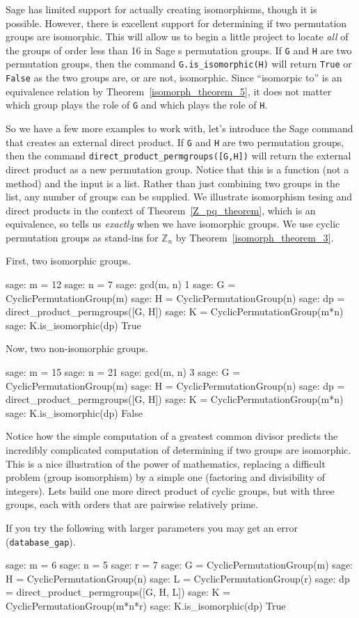 Sage has limited support for actually creating isomorphisms, though it is possible.  However, there is excellent support for determining if two permutation groups are isomorphic.  This will allow us to begin a little project to locate \emph{all} of the groups of order less than 16 in Sage s permutation groups.
%
%
If \verb?G? and \verb?H? are two permutation groups, then the command \verb?G.is_isomorphic(H)? will return \verb?True? or \verb?False? as the two groups are, or are not, isomorphic.  Since ``isomorpic to'' is an equivalence relation by Theorem~\ref{isomorph_theorem_5}, it does not matter which group plays the role of \verb?G? and which plays the role of \verb?H?.\par
%
So we have a few more examples to work with, let's introduce the Sage command that creates an external direct product.  If \verb?G? and \verb?H? are two permutation groups, then the command \verb?direct_product_permgroups([G,H])? will  return the external direct product as a new permutation group.  Notice that this is a function (not a method) and the input is a list.  Rather than just combining two groups in the list, any number of groups can be supplied.  We illustrate isomorphism tesing and direct products in the context of Theorem~\ref{Z_pq_theorem}, which is an equivalence, so tells us \emph{exactly} when we have isomorphic groups.  We use cyclic permutation groups as stand-ins for ${\mathbb Z}_n$ by Theorem~\ref{isomorph_theorem_3}.\par
%
First, two isomorphic groups.
%
\begin{sageexample}
sage: m = 12
sage: n = 7
sage: gcd(m, n)
1
sage: G = CyclicPermutationGroup(m)
sage: H = CyclicPermutationGroup(n)
sage: dp = direct_product_permgroups([G, H])
sage: K = CyclicPermutationGroup(m*n)
sage: K.is_isomorphic(dp)
True
\end{sageexample}
%
Now, two non-isomorphic groups.
%
\begin{sageexample}
sage: m = 15
sage: n = 21
sage: gcd(m, n)
3
sage: G = CyclicPermutationGroup(m)
sage: H = CyclicPermutationGroup(n)
sage: dp = direct_product_permgroups([G, H])
sage: K = CyclicPermutationGroup(m*n)
sage: K.is_isomorphic(dp)
False
\end{sageexample}
%
Notice how the simple computation of a greatest common divisor predicts the incredibly complicated computation of determining if two groups are isomorphic.  This is a nice illustration of the power of mathematics, replacing a difficult problem (group isomorphism) by a simple one (factoring and divisibility of integers).  Lets build one more direct product of cyclic groups, but with three groups, each with orders that are pairwise relatively prime.\par
%
If you try the following with larger parameters you may get an error (\verb?database_gap?).
%
\begin{sageexample}
sage: m = 6
sage: n = 5
sage: r = 7
sage: G = CyclicPermutationGroup(m)
sage: H = CyclicPermutationGroup(n)
sage: L = CyclicPermutationGroup(r)
sage: dp = direct_product_permgroups([G, H, L])
sage: K = CyclicPermutationGroup(m*n*r)
sage: K.is_isomorphic(dp)
True
\end{sageexample}
%
